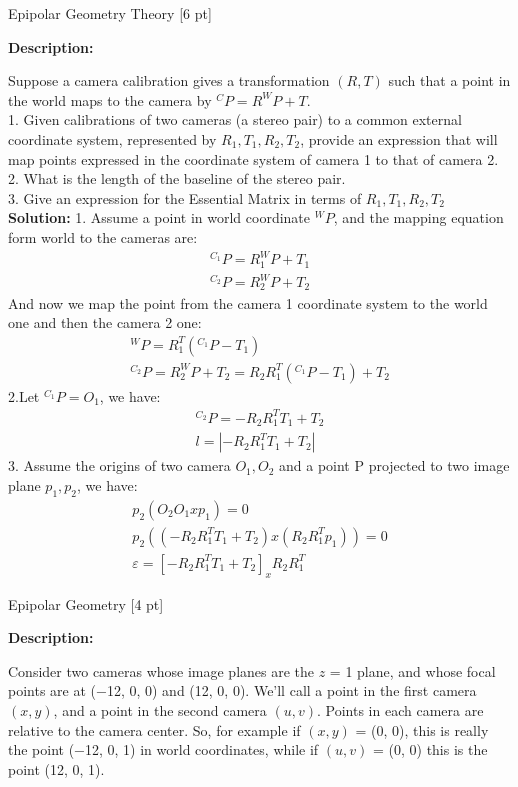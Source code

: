 \documentclass{assignment}
\date{November 8, 2016}
\begin{document}
\begin{problemlist}

\pbitem Epipolar Geometry Theory [6 pt]

\textbf{Description:}

Suppose a camera calibration gives a transformation $(R, T)$ such that a point in the world maps to the camera by $^{C}P = R^{W}P + T$.\\

1. Given calibrations of two cameras (a stereo pair) to a common external coordinate system, represented by $R_1, T_1, R_2, T_2$, provide an expression that will map points expressed in the coordinate system of camera 1 to that of camera 2.\\
2. What is the length of the baseline of the stereo pair.\\
3. Give an expression for the Essential Matrix in terms of $R_1, T_1, R_2, T_2$\\

\textbf{Solution:}
1. Assume a point in world coordinate $^WP$, and the mapping equation form world to the cameras are:
\begin{align*}
    ^{C_1}P = R_1^{W}P + T_1\\
    ^{C_2}P = R_2^{W}P + T_2
\end{align*}
And now we map the point from the camera 1 coordinate system to the world one and then the camera 2 one:
\begin{align*}
    ^{W}P = R_1^{T}(^{C_1}P - T_1)\\
    ^{C_2}P = R_2^{W}P + T_2 = R_2R_1^{T}(^{C_1}P-T_1) + T_2
\end{align*}
2.Let $^{C_1}P = O_1$, we have:
\begin{align*}
    ^{C_2}P = -R_2R_1^{T}T_1 + T_2\\
    l = |-R_2R_1^{T}T_1 + T_2|
\end{align*}
3. Assume the origins of two camera $O_1, O_2$ and a point P projected to two image plane $p_1, p_2$, we have:
\begin{align*}
    p_2(O_2O_1xp_1) = 0\\
    p_2((-R_2R_1^{T}T_1+T_2)x(R_2R_1^{T}p_1))=0\\
    \varepsilon = [-R_2R_1^{T}T_1+T_2]_xR_2R_1^{T}
\end{align*}

\newpage
\pbitem Epipolar Geometry [4 pt]

\textbf{Description:}

Consider two cameras whose image planes are the $z$ = 1 plane, and whose focal points are at (−12, 0, 0) and (12, 0, 0). We’ll call a point in the first camera $(x, y)$, and a point in the second camera $(u, v)$. Points in each camera are relative to the camera center. So, for example if $(x, y)$ = (0, 0), this is really the point (−12, 0, 1) in world coordinates, while if $(u, v)$ = (0, 0) this is the point (12, 0, 1).



\end{problemlist}
\end{document}
